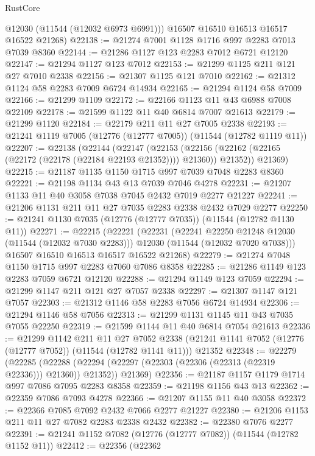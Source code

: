 \begin{lexlean}{RustCore}
\begin{coremodule}
        @12030
        (@11544 (@12032 @6973 @6991)))
      @16507
      @16510
      @16513
      @16517
      @16522
      @21268)
@22138 := @21274 @7001 @1128 @1716 @997 @2283 @7013 @7039 @8360
@22144 := @21286 @1127 @123 @2283 @7012 @6721 @12120
@22147 := @21294 @1127 @123 @7012
@22153 := @21299 @1125 @211 @121 @27 @7010 @2338
@22156 := @21307 @1125 @121 @7010
@22162 := @21312 @1124 @58 @2283 @7009 @6724 @14934
@22165 := @21294 @1124 @58 @7009
@22166 := @21299 @1109
@22172 := @22166 @1123 @11 @43 @6988 @7008 @22109
@22178 := @21599 @1122 @11 @40 @6814 @7007 @21613
@22179 := @21299 @1120
@22184 := @22179 @211 @11 @27 @7005 @2338
@22193 := @21241 @1119 @7005 (@12776 (@12777 @7005)) (@11544 (@12782 @1119 @11))
@22207 := @22138
    (@22144
      (@22147
        (@22153 (@22156 (@22162 (@22165 (@22172 (@22178 (@22184 @22193 @21352)))) @21360)) @21352))
      @21369)
@22215 := @21187 @1135 @1150 @1715 @997 @7039 @7048 @2283 @8360
@22221 := @21198 @1134 @43 @13 @7039 @7046 @4278
@22231 := @21207 @1133 @11 @40 @3058 @7038 @7045 @2432 @7019 @2277 @21227
@22241 := @21206 @1131 @211 @11 @27 @7035 @2283 @2338 @2432 @7029 @2277
@22250 := @21241 @1130 @7035 (@12776 (@12777 @7035)) (@11544 (@12782 @1130 @11))
@22271 := @22215
    (@22221
      (@22231
        (@22241 @22250 @21248 @12030 (@11544 (@12032 @7030 @2283)))
        @12030
        (@11544 (@12032 @7020 @7038)))
      @16507
      @16510
      @16513
      @16517
      @16522
      @21268)
@22279 := @21274 @7048 @1150 @1715 @997 @2283 @7060 @7086 @8358
@22285 := @21286 @1149 @123 @2283 @7059 @6721 @12120
@22288 := @21294 @1149 @123 @7059
@22294 := @21299 @1147 @211 @121 @27 @7057 @2338
@22297 := @21307 @1147 @121 @7057
@22303 := @21312 @1146 @58 @2283 @7056 @6724 @14934
@22306 := @21294 @1146 @58 @7056
@22313 := @21299 @1131 @1145 @11 @43 @7035 @7055 @22250
@22319 := @21599 @1144 @11 @40 @6814 @7054 @21613
@22336 := @21299
    @1142
    @211
    @11
    @27
    @7052
    @2338
    (@21241 @1141 @7052 (@12776 (@12777 @7052)) (@11544 (@12782 @1141 @11)))
    @21352
@22348 := @22279
    (@22285
      (@22288 (@22294 (@22297 (@22303 (@22306 (@22313 (@22319 @22336))) @21360)) @21352))
      @21369)
@22356 := @21187 @1157 @1179 @1714 @997 @7086 @7095 @2283 @8358
@22359 := @21198 @1156 @43 @13
@22362 := @22359 @7086 @7093 @4278
@22366 := @21207 @1155 @11 @40 @3058
@22372 := @22366 @7085 @7092 @2432 @7066 @2277 @21227
@22380 := @21206 @1153 @211 @11 @27 @7082 @2283 @2338 @2432
@22382 := @22380 @7076 @2277
@22391 := @21241 @1152 @7082 (@12776 (@12777 @7082)) (@11544 (@12782 @1152 @11))
@22412 := @22356
    (@22362

\end{coremodule}
\end{lexlean}

